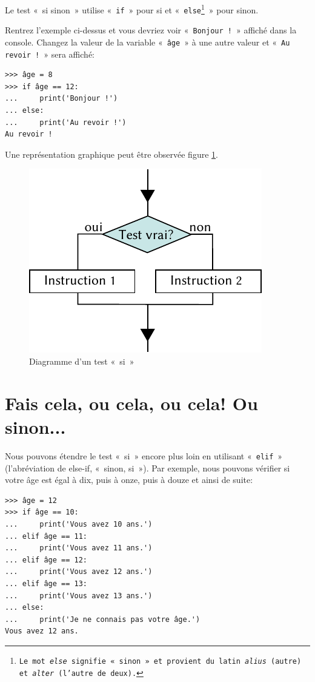 Le test « si sinon » utilise « \texttt{if} » pour si et « \texttt{else\footnote{Le mot \emph{else} signifie « sinon » et provient du latin \emph{alius} (autre) et \emph{alter} (l'autre de deux).}} » pour sinon.

Rentrez l'exemple ci-dessus et vous devriez voir « \texttt{Bonjour !} » affiché dans la console.
Changez la valeur de la variable « \texttt{âge} »  à une autre valeur et « \texttt{Au revoir !} »  sera affiché:

\begin{Verbatim}[frame=single,rulecolor=\color{green}, label=à taper avec attention]
>>> âge = 8
>>> if âge == 12:
...     print('Bonjour !')
... else:
...     print('Au revoir !')
Au revoir !
\end{Verbatim}

Une représentation graphique peut être observée figure \ref{fig:Cf-else-fr}.

\begin{figure}[ht]
\centering
\includegraphics[scale=1.5]{images/Cf-else-fr.pdf}
\caption{Diagramme d'un test « si »}
\label{fig:Cf-else-fr}
\end{figure}


\section{Fais cela, ou cela, ou cela! Ou sinon...}
Nous pouvons étendre le test « si » encore plus loin en utilisant « \texttt{elif} » (l'abréviation  de else-if, « sinon, si »). Par exemple, nous pouvons vérifier si votre âge est égal à dix, puis à onze, puis à douze et ainsi de suite: 

\begin{Verbatim}[frame=single,rulecolor=\color{green}, label=à taper avec attention]
>>> âge = 12
>>> if âge == 10:
...     print('Vous avez 10 ans.')
... elif âge == 11:
...     print('Vous avez 11 ans.')
... elif âge == 12:
...     print('Vous avez 12 ans.')
... elif âge == 13:
...     print('Vous avez 13 ans.')
... else:
...     print('Je ne connais pas votre âge.')
Vous avez 12 ans.
\end{Verbatim}

